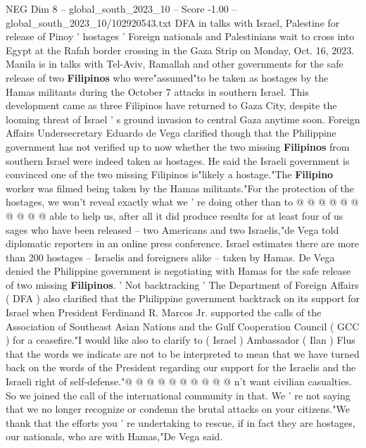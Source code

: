 \begin{textsample}{NEG Dim 8 – global\_south\_2023\_10 – Score -1.00 – global\_south\_2023\_10/102920543.txt}  \label{ex:f8_neg_096}
DFA in talks with Israel, Palestine for release of Pinoy ' hostages ' Foreign nationals and Palestinians wait to cross into Egypt at the Rafah border crossing in the Gaza Strip on Monday, Oct. 16, 2023.
Manila is in talks with Tel-Aviv, Ramallah and other governments for the safe release of two \textbf{Filipinos} who were"assumed"to be taken as hostages by the Hamas militants during the October 7 attacks in southern Israel.
This development came as three Filipinos have returned to Gaza City, despite the looming threat of Israel ' s ground invasion to central Gaza anytime soon.
Foreign Affairs Undersecretary Eduardo de Vega clarified though that the Philippine government has not verified up to now whether the two missing \textbf{Filipinos} from southern Israel were indeed taken as hostages.
He said the Israeli government is convinced one of the two missing Filipinos is"likely a hostage."The \textbf{Filipino} worker was filmed being taken by the Hamas militants."For the protection of the hostages, we won't reveal exactly what we ' re doing other than to @ @ @ @ @ @ @ @ @ @ able to help us, after all it did produce results for at least four of us sages who have been released -- two Americans and two Israelis,"de Vega told diplomatic reporters in an online press conference.
Israel estimates there are more than 200 hostages -- Israelis and foreigners alike -- taken by Hamas.
De Vega denied the Philippine government is negotiating with Hamas for the safe release of two missing \textbf{Filipinos}. ' Not backtracking ' The Department of Foreign Affairs ( DFA ) also clarified that the Philippine government backtrack on its support for Israel when President Ferdinand R.
Marcos Jr. supported the calls of the Association of Southeast Asian Nations and the Gulf Cooperation Council ( GCC ) for a ceasefire."I would like also to clarify to ( Israel ) Ambassador ( Ilan ) Flus that the words we indicate are not to be interpreted to mean that we have turned back on the words of the President regarding our support for the Israelis and the Israeli right of self-defense."@ @ @ @ @ @ @ @ @ @ n't want civilian casualties.
So we joined the call of the international community in that.
We ' re not saying that we no longer recognize or condemn the brutal attacks on your citizens."We thank that the efforts you ' re undertaking to rescue, if in fact they are hostages, our nationals, who are with Hamas,"De Vega said.

\end{textsample}
